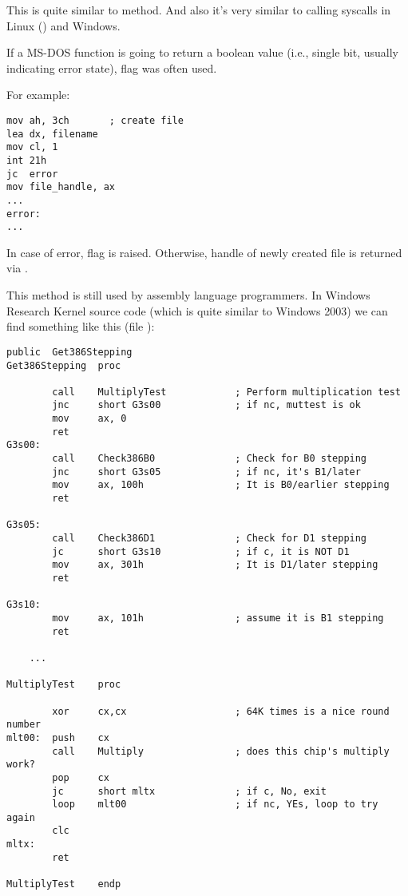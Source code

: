 This is quite similar to  method.
And also it's very similar to calling syscalls in Linux () and Windows.

If a MS-DOS function is going to return a boolean value (i.e., single bit, usually indicating error state),
 flag was often used.

For example:

\begin{lstlisting}[style=customasmx86]
mov ah, 3ch       ; create file
lea dx, filename
mov cl, 1
int 21h
jc  error
mov file_handle, ax
...
error:
...
\end{lstlisting}

In case of error,  flag is raised. Otherwise, handle of newly created file is returned via .

This method is still used by assembly language programmers.
In Windows Research Kernel source code (which is quite similar to Windows 2003) we can find something like this
(file ):

\begin{lstlisting}[style=customasmx86]
        public  Get386Stepping
Get386Stepping  proc

        call    MultiplyTest            ; Perform multiplication test
        jnc     short G3s00             ; if nc, muttest is ok
        mov     ax, 0
        ret
G3s00:
        call    Check386B0              ; Check for B0 stepping
        jnc     short G3s05             ; if nc, it's B1/later
        mov     ax, 100h                ; It is B0/earlier stepping
        ret

G3s05:
        call    Check386D1              ; Check for D1 stepping
        jc      short G3s10             ; if c, it is NOT D1
        mov     ax, 301h                ; It is D1/later stepping
        ret

G3s10:
        mov     ax, 101h                ; assume it is B1 stepping
        ret

	...

MultiplyTest    proc

        xor     cx,cx                   ; 64K times is a nice round number
mlt00:  push    cx
        call    Multiply                ; does this chip's multiply work?
        pop     cx
        jc      short mltx              ; if c, No, exit
        loop    mlt00                   ; if nc, YEs, loop to try again
        clc
mltx:
        ret

MultiplyTest    endp
\end{lstlisting}

